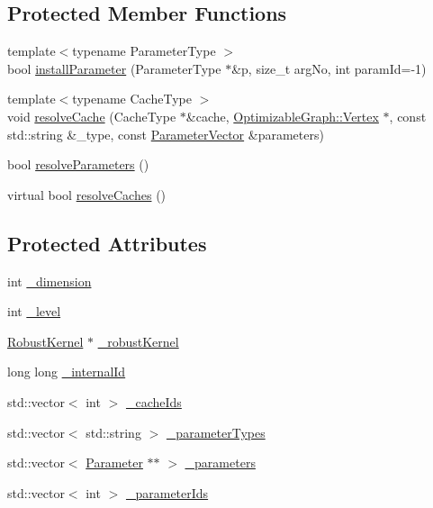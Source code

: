 \subsection*{Protected Member Functions}
\begin{DoxyCompactItemize}
\item 
{\footnotesize template$<$typename Parameter\+Type $>$ }\\bool \mbox{\hyperlink{classg2o_1_1_optimizable_graph_1_1_edge_a237bea2f2fb7cc6a9cf4ee5ee6fe4d88}{install\+Parameter}} (Parameter\+Type $\ast$\&p, size\+\_\+t arg\+No, int param\+Id=-\/1)
\item 
{\footnotesize template$<$typename Cache\+Type $>$ }\\void \mbox{\hyperlink{classg2o_1_1_optimizable_graph_1_1_edge_ad95f2883af693de56e46a2b272dc1cdc}{resolve\+Cache}} (Cache\+Type $\ast$\&cache, \mbox{\hyperlink{classg2o_1_1_optimizable_graph_1_1_vertex}{Optimizable\+Graph\+::\+Vertex}} $\ast$, const std\+::string \&\+\_\+type, const \mbox{\hyperlink{namespaceg2o_a85cc8f2c7db8cab47b2b269a7acd6785}{Parameter\+Vector}} \&parameters)
\item 
bool \mbox{\hyperlink{classg2o_1_1_optimizable_graph_1_1_edge_addadf494f3a1c8bf467a74454d771d0d}{resolve\+Parameters}} ()
\item 
virtual bool \mbox{\hyperlink{classg2o_1_1_optimizable_graph_1_1_edge_aa93e3a4f976b467994f4eb7679a04bf3}{resolve\+Caches}} ()
\end{DoxyCompactItemize}
\subsection*{Protected Attributes}
\begin{DoxyCompactItemize}
\item 
int \mbox{\hyperlink{classg2o_1_1_optimizable_graph_1_1_edge_a4e651628f7657c81d0e4c1b26caaa6aa}{\+\_\+dimension}}
\item 
int \mbox{\hyperlink{classg2o_1_1_optimizable_graph_1_1_edge_a57132078028dd0455aef141e62e07db9}{\+\_\+level}}
\item 
\mbox{\hyperlink{classg2o_1_1_robust_kernel}{Robust\+Kernel}} $\ast$ \mbox{\hyperlink{classg2o_1_1_optimizable_graph_1_1_edge_a6b942321f9e4e82051d529efb255af35}{\+\_\+robust\+Kernel}}
\item 
long long \mbox{\hyperlink{classg2o_1_1_optimizable_graph_1_1_edge_abdfc449ed57479d90d2e57a8bc0bea12}{\+\_\+internal\+Id}}
\item 
std\+::vector$<$ int $>$ \mbox{\hyperlink{classg2o_1_1_optimizable_graph_1_1_edge_a56bddaadd70570dbd96e8deed3d4b34c}{\+\_\+cache\+Ids}}
\item 
std\+::vector$<$ std\+::string $>$ \mbox{\hyperlink{classg2o_1_1_optimizable_graph_1_1_edge_a08666609850240956c64c95ae5ae0f2c}{\+\_\+parameter\+Types}}
\item 
std\+::vector$<$ \mbox{\hyperlink{classg2o_1_1_parameter}{Parameter}} $\ast$$\ast$ $>$ \mbox{\hyperlink{classg2o_1_1_optimizable_graph_1_1_edge_a41c4d6a404d0b057d37fac43edec40ed}{\+\_\+parameters}}
\item 
std\+::vector$<$ int $>$ \mbox{\hyperlink{classg2o_1_1_optimizable_graph_1_1_edge_a33a35663ba5b096cb6e6078014bd6f17}{\+\_\+parameter\+Ids}}
\end{DoxyCompactItemize}
